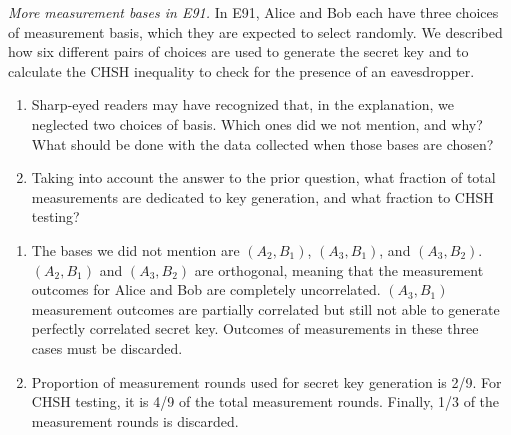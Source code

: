 \begin{exercise}
\emph{More measurement bases in E91.} In E91, Alice and Bob each have three choices of measurement basis, which they are expected to select randomly.  We described how six different pairs of choices are used to generate the secret key and to calculate the CHSH inequality to check for the presence of an eavesdropper.
\begin{enumerate}[label=(\alph*)]
    \item Sharp-eyed readers may have recognized that, in the explanation, we neglected two choices of basis.  Which ones did we not mention, and why?  What should be done with the data collected when those bases are chosen?
    \item Taking into account the answer to the prior question, what fraction of total measurements are dedicated to key generation, and what fraction to CHSH testing?
\end{enumerate}
\end{exercise}
\begin{solution}
\begin{enumerate}[label=(\alph*)]
    \item The bases we did not mention are $(A_2,B_1)$, $(A_3,B_1)$, and $(A_3,B_2)$. $(A_2,B_1)$ and $(A_3,B_2)$ are orthogonal, meaning that the measurement outcomes for Alice and Bob are completely uncorrelated. $(A_3,B_1)$ measurement outcomes are partially correlated but still not able to generate perfectly correlated secret key. Outcomes of measurements in these three cases must be discarded.
    \item Proportion of measurement rounds used for secret key generation is 2/9. For CHSH testing, it is 4/9 of the total measurement rounds. Finally, 1/3 of the measurement rounds is discarded.
\end{enumerate}
\end{solution}

